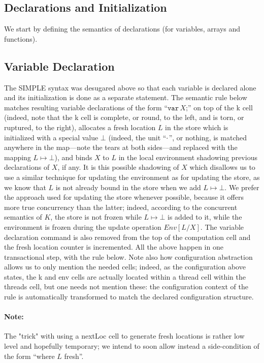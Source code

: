 \documentclass{article}
\begin{document}
\begin{kdefinition}
\begin{module}{}
\begin{kblock}[text]
 \section{Declarations and Initialization}
We start by defining the semantics of declarations (for variables,
arrays and functions). \end{kblock}
\begin{kblock}[text]
 \subsection{Variable Declaration}
The SIMPLE syntax was desugared above so that each variable is
declared alone and its initialization is done as a separate statement.
The semantic rule below matches resulting variable declarations of the
form ``$\texttt{var}\,X\texttt{;}$'' on top of the \textsf{k} cell
(indeed, note that the \textsf{k} cell is complete, or round, to the
left, and is torn, or ruptured, to the right), allocates a fresh
location $L$ in the store which is initialized with a special value
$\bot$ (indeed, the unit ``$\cdot$'', or nothing, is matched anywhere
in the map---note the tears at both sides---and replaced with the
mapping $L\mapsto \bot$), and binds $X$ to $L$ in the local
environment shadowing previous declarations of $X$, if any.  It is
this possible shadowing of $X$ which disallows us to use a similar
technique for updating the environment as for updating the store, as
we know that $L$ is not already bound in the store when we add $L
\mapsto \bot$.  We prefer the approach used for updating the store
whenever possible, because it offers more true concurrency than the
latter; indeed, according to the concurrent semantics of $K$, the
store is not frozen while $L\mapsto \bot$ is added to it, while the
environment is frozen during the update operation
$\textit{Env}[L/X]$.  The variable declaration command is also removed
from the top of the computation cell and the fresh location counter is
incremented.  All the above happen in one transactional step, with the
rule below.  Note also how configuration abstraction allows us to only
mention the needed cells; indeed, as the configuration above states,
the \textsf{k} and \textsf{env} cells are actually located within a
\textsf{thread} cell within the \textsf{threads} cell, but one needs
not mention these: the configuration context of the rule is
automatically transformed to match the declared configuration
structure.

\paragraph{Note:}{The "trick" with using a \textsf{nextLoc} cell to generate
fresh locations is rather low level and hopefully temporary; we intend to
soon allow instead a side-condition of the form ``where $L$ fresh''.} \end{kblock}


\end{module}
\end{kdefinition}
\end{document}
